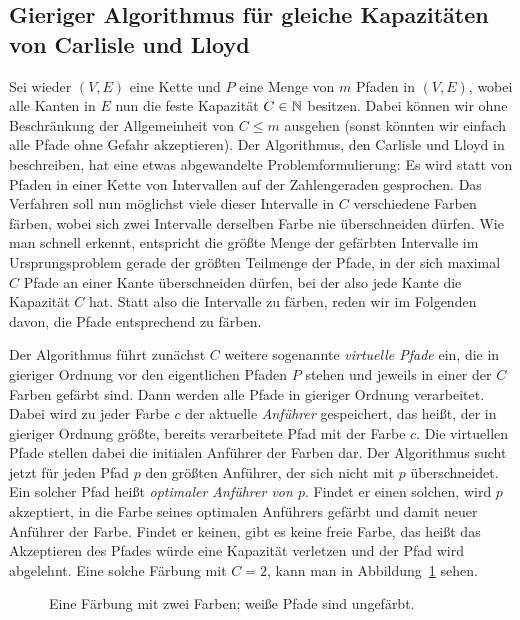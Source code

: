 \subsection{Gieriger Algorithmus für gleiche Kapazitäten von Carlisle und Lloyd}\label{subsec:algorithmusGleicheKapazitäten}
Sei wieder $(V,E)$ eine Kette und $P$ eine Menge von $m$ Pfaden in $(V,E)$, wobei alle Kanten in $E$ nun die
feste Kapazität $C \in \mathbb N$ besitzen.
Dabei können wir ohne Beschränkung der Allgemeinheit von $C \leq m$ ausgehen (sonst könnten wir einfach alle Pfade ohne Gefahr
akzeptieren).
Der Algorithmus, den Carlisle und Lloyd in~\cite{carlisle} beschreiben, hat eine etwas abgewandelte Problemformulierung:
Es wird statt von Pfaden in einer Kette von Intervallen auf der Zahlengeraden gesprochen.
Das Verfahren soll nun möglichst viele dieser Intervalle in $C$ verschiedene Farben färben, wobei sich zwei Intervalle derselben
Farbe nie überschneiden dürfen.
Wie man schnell erkennt, entspricht die größte Menge der gefärbten Intervalle im Ursprungsproblem gerade der größten Teilmenge der Pfade,
in der sich maximal $C$ Pfade an einer Kante überschneiden dürfen, bei der also jede Kante die Kapazität $C$ hat.
Statt also die Intervalle zu färben, reden wir im Folgenden davon, die Pfade entsprechend zu färben.

Der Algorithmus führt zunächst $C$ weitere sogenannte {\em virtuelle Pfade} ein, die in gieriger Ordnung
vor den eigentlichen Pfaden $P$ stehen und jeweils in einer der $C$ Farben gefärbt sind.
Dann werden alle Pfade in gieriger Ordnung verarbeitet.
Dabei wird zu jeder Farbe $c$ der aktuelle {\em Anführer} gespeichert, das heißt, der in gieriger Ordnung größte, bereits
verarbeitete Pfad mit der Farbe $c$.
Die virtuellen Pfade stellen dabei die initialen Anführer der Farben dar.
Der Algorithmus sucht jetzt für jeden Pfad $p$ den größten Anführer, der sich nicht mit $p$ überschneidet.
Ein solcher Pfad heißt {\em optimaler Anführer von $p$}.
Findet er einen solchen, wird $p$ akzeptiert, in die Farbe seines optimalen Anführers gefärbt und damit neuer Anführer
der Farbe.
Findet er keinen, gibt es keine freie Farbe, das heißt das Akzeptieren des Pfades würde eine Kapazität verletzen und der
Pfad wird abgelehnt.
Eine solche Färbung mit $C = 2$, kann man in Abbildung~\ref{fig:k-coloring} sehen.

\begin{figure}[htbp]
	\centering
	\def\svgwidth{220bp}
	
	\caption{Eine Färbung mit zwei Farben; weiße Pfade sind ungefärbt.}
	\label{fig:k-coloring}
\end{figure}

